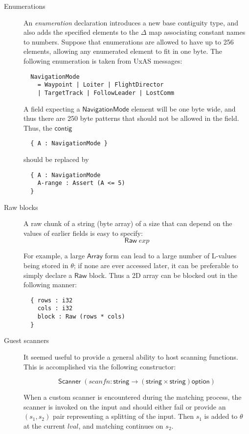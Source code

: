 \documentclass[a4paper,UKenglish,cleveref, autoref, thm-restate]{lipics-v2021}
\newcommand{\konst}[1]{\ensuremath{\mathsf{#1}}}
\newcommand{\lval}{\ensuremath{\mathit{lval}}}
\begin{document}
\begin{description}

\item [Enumerations] An \emph{enumeration} declaration
introduces a new base contiguity type, and also adds the specified
elements to the $\Delta$ map associating constant names to numbers.
Suppose that enumerations are allowed to have up to 256 elements,
allowing any enumerated element to fit in one byte. The following
enumeration is taken from UxAS messages:
{\small
\begin{verbatim}
  NavigationMode
    = Waypoint | Loiter | FlightDirector
    | TargetTrack | FollowLeader | LostComm
\end{verbatim}
}
A field expecting a \konst{NavigationMode} element will be one byte wide,
and thus there are 250 byte patterns that should not be allowed in the
field. Thus, the \konst{contig}

{\small\begin{verbatim}
  { A : NavigationMode }
\end{verbatim}
}
should be replaced by

{\small
\begin{verbatim}
  { A : NavigationMode
    A-range : Assert (A <= 5)
  }
\end{verbatim}
}

\item [Raw blocks] A raw chunk of a string (byte array) of a size that
  can depend on the values of earlier fields is easy to specify:
  \[ \konst{Raw}\; \mathit{exp} \]

For example, a large \konst{Array} form can lead to a large number of
L-values being stored in $\theta$; if none are ever accessed later, it
can be preferable to simply declare a \konst{Raw} block. Thus a 2D
array can be blocked out in the following manner:

{\small
\begin{verbatim}
  { rows : i32
    cols : i32
    block : Raw (rows * cols)
  }
\end{verbatim}
}

\item [Guest scanners] It seemed useful to provide a general ability
  to host scanning functions. This is accomplished via the following
  constructor:

  \[ \konst{Scanner}\;
     (\mathit{scanfn} : \konst{string} \to (\konst{string} \times \konst{string})\konst{option}) \]

  When a custom scanner is encountered during the matching process,
  the scanner is invoked on the input and should either fail or
  provide an $(s_1,s_2)$ pair representing a splitting of the
  input. Then $s_1$ is added to $\theta$ at the current \lval, and
  matching continues on $s_2$.


\end{description}
\end{document}

